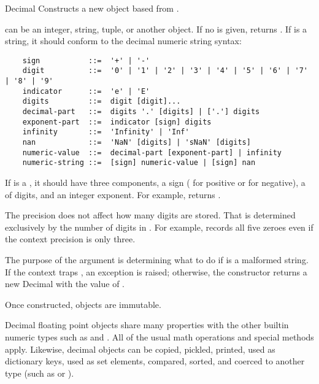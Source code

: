 \begin{classdesc}{Decimal}{}
  Constructs a new  object based from .

   can be an integer, string, tuple, or another 
  object. If no  is given, returns .  If
   is a string, it should conform to the decimal numeric string
  syntax:
    
  \begin{verbatim}
    sign           ::=  '+' | '-'
    digit          ::=  '0' | '1' | '2' | '3' | '4' | '5' | '6' | '7' | '8' | '9'
    indicator      ::=  'e' | 'E'
    digits         ::=  digit [digit]...
    decimal-part   ::=  digits '.' [digits] | ['.'] digits
    exponent-part  ::=  indicator [sign] digits
    infinity       ::=  'Infinity' | 'Inf'
    nan            ::=  'NaN' [digits] | 'sNaN' [digits]
    numeric-value  ::=  decimal-part [exponent-part] | infinity
    numeric-string ::=  [sign] numeric-value | [sign] nan  
  \end{verbatim}

  If  is a , it should have three components,
  a sign ( for positive or  for negative),
  a  of digits, and an integer exponent. For example,
   returns .

  The  precision does not affect how many digits are stored.
  That is determined exclusively by the number of digits in . For
  example,  records all five zeroes even if the
  context precision is only three.

  The purpose of the  argument is determining what to do if
   is a malformed string.  If the context traps
  , an exception is raised; otherwise, the
  constructor returns a new Decimal with the value of .

  Once constructed,  objects are immutable.
\end{classdesc}

Decimal floating point objects share many properties with the other builtin
numeric types such as  and .  All of the usual
math operations and special methods apply.  Likewise, decimal objects can
be copied, pickled, printed, used as dictionary keys, used as set elements,
compared, sorted, and coerced to another type (such as 
or ).

